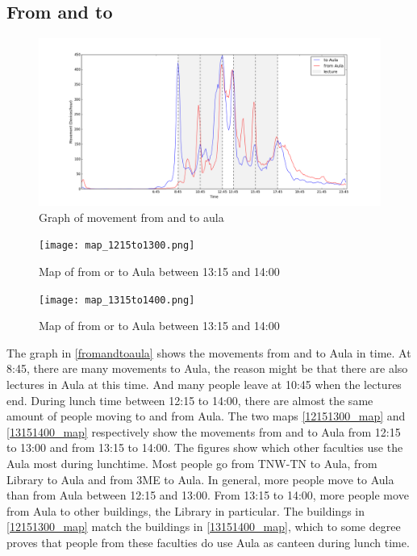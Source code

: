 \subsection{From and to}\label{chapter9fromto}
\begin{figure}[H]
	\centering
	\includegraphics[scale=0.3]{building_fromTo_aulaGraph.png}
	\captionsetup{justification=centering}
	\caption{Graph of movement from and to aula}
	\label{fromandtoaula}
\end{figure}


\begin{figure}[H]
	\centering
	\texttt{[image: map\_1215to1300.png]}
	\captionsetup{justification=centering}
	\caption{Map of from or to Aula between 13:15 and 14:00}
	\label{12151300_map}
\end{figure}

\begin{figure}[H]
	\centering
	\texttt{[image: map\_1315to1400.png]}
	\captionsetup{justification=centering}
	\caption{Map of from or to Aula between 13:15 and 14:00}
	\label{13151400_map}
\end{figure}
The graph in \autoref{fromandtoaula} shows the movements from and to Aula in time. At 8:45, there are many movements to Aula, the reason might be that there are also lectures in Aula at this time. And many people leave at 10:45 when the lectures end. During lunch time between 12:15 to 14:00, there are almost the same amount of people moving to and from Aula.
The two maps \autoref{12151300_map} and \autoref{13151400_map} respectively show the movements from and to Aula from 12:15 to 13:00 and from 13:15 to 14:00. The figures show which other faculties use the Aula most during lunchtime.
Most people go from TNW-TN to Aula, from Library to Aula and from 3ME to Aula. In general, more people move to Aula than from Aula between 12:15 and 13:00. From 13:15 to 14:00, more people move from Aula to other buildings, the Library in particular. The buildings in \autoref{12151300_map} match the buildings in \autoref{13151400_map}, which to some degree proves that people from these faculties do use Aula as canteen during lunch time.